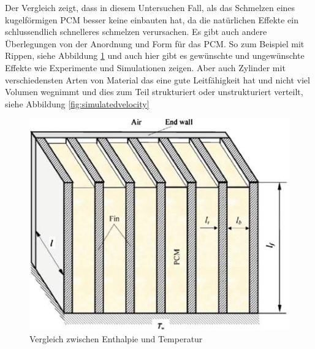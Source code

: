 \documentclass[11pt,a4paper]{scrartcl}
\begin{document}
Der Vergleich zeigt, dass in diesem Untersuchen Fall, als das Schmelzen eines kugelförmigen PCM besser keine einbauten hat, da die natürlichen Effekte ein schlussendlich schnelleres schmelzen verursachen.
Es gibt auch andere Überlegungen von der Anordnung und Form für das PCM. So zum Beispiel mit Rippen, siehe Abbildung \ref{fig:threedimensionalphysicalmodel} und auch hier gibt es gewünschte und ungewünschte Effekte wie Experimente und Simulationen zeigen. Aber auch Zylinder mit verschiedensten Arten von Material das eine gute Leitfähigkeit hat und nicht viel Volumen wegnimmt und dies zum Teil strukturiert oder unstrukturiert verteilt, siehe Abbildung \ref{fig:simulatedvelocity}

\begin{figure}[h!]
\begin{center}
\includegraphics[scale=0.5]{images/threedimensionalphysicalmodel.jpg}
\caption{Vergleich zwischen Enthalpie und Temperatur \cite{WasteEnergyHarvesting}}
\label{fig:threedimensionalphysicalmodel}
\end{center}
\end{figure}
\end{document}
